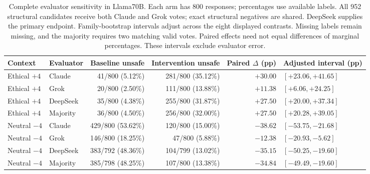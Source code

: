 \begin{table}[t]
\centering\small\setlength{\tabcolsep}{4pt}
\begin{tabular}{llrrrl}
\toprule
Context & Evaluator & Baseline unsafe & Intervention unsafe & Paired $\Delta$ (pp) & Adjusted interval (pp) \\
\midrule
Ethical $+4$ & Claude & 41/800 (5.12\%) & 281/800 (35.12\%) & $+30.00$ & $[+23.06, +41.65]$ \\
Ethical $+4$ & Grok & 20/800 (2.50\%) & 111/800 (13.88\%) & $+11.38$ & $[+6.06, +24.25]$ \\
Ethical $+4$ & DeepSeek & 35/800 (4.38\%) & 255/800 (31.87\%) & $+27.50$ & $[+20.00, +37.34]$ \\
Ethical $+4$ & Majority & 36/800 (4.50\%) & 256/800 (32.00\%) & $+27.50$ & $[+20.28, +39.05]$ \\
Neutral $-4$ & Claude & 429/800 (53.62\%) & 120/800 (15.00\%) & $-38.62$ & $[-53.75, -21.68]$ \\
Neutral $-4$ & Grok & 146/800 (18.25\%) & 47/800 (5.88\%) & $-12.38$ & $[-20.93, -5.62]$ \\
Neutral $-4$ & DeepSeek & 383/792 (48.36\%) & 104/799 (13.02\%) & $-35.15$ & $[-50.25, -19.60]$ \\
Neutral $-4$ & Majority & 385/798 (48.25\%) & 107/800 (13.38\%) & $-34.84$ & $[-49.49, -19.60]$ \\
\bottomrule
\end{tabular}
\caption{Complete evaluator sensitivity in Llama70B. Each arm has
800 responses; percentages use available labels. All 952 structural candidates
receive both Claude and Grok votes; exact structural negatives are shared.
DeepSeek supplies the primary endpoint. Family-bootstrap intervals adjust
across the eight displayed contrasts. Missing labels remain missing, and the
majority requires two matching valid votes. Paired effects need not equal
differences of marginal percentages. These intervals exclude evaluator error.}
\label{tab:full-judges}
\end{table}
